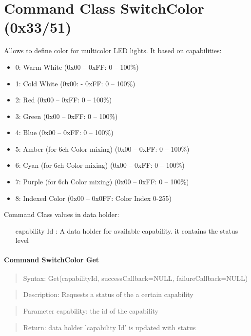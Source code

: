 \section{Command Class SwitchColor (0x33/51)}	

Allows to define color for multicolor LED lights. It based on capabilities:
\begin{itemize}
\item 0: Warm White (0x00 – 0xFF: 0 – 100\%)
\item 1: Cold White (0x00: - 0xFF: 0 – 100\%)
\item 2: Red (0x00 – 0xFF: 0 – 100\%)
\item 3: Green (0x00 – 0xFF: 0 – 100\%)
\item 4: Blue (0x00 – 0xFF: 0 – 100\%)
\item 5: Amber (for 6ch Color mixing) (0x00 – 0xFF: 0 – 100\%)
\item 6: Cyan (for 6ch Color mixing) (0x00 – 0xFF: 0 – 100\%)
\item 7: Purple (for 6ch Color mixing) (0x00 – 0xFF: 0 – 100\%)
\item 8: Indexed Color (0x00 – 0x0FF: Color Index 0-255)
\end{itemize}

Command Class values in data holder:
\begin{itemize}
\item [capability Id]: A data holder for available capability. it contains the status level
\end{itemize}

\paragraph {Command SwitchColor Get}
\begin{quote} Syntax: Get(capabilityId, successCallback=NULL, failureCallback=NULL)\end{quote}
\begin{quote} Description: Requests a status of the a certain capability\end{quote}
\begin{quote} Parameter capability: the id of the capability\end{quote}
\begin{quote} Return: data holder 'capability Id' is updated with status \end{quote}

